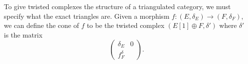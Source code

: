 
 
 To give twisted complexes the structure of a triangulated category, we must specify what the exact triangles are. Given a morphism $f: (E, \delta_E)\to (F, \delta_F)$, we can define the cone of $f$ to be the twisted complex $(E[1]\oplus F, \delta')$ where $\delta'$ is the matrix
 \[
    \left(\begin{array}{c|c} \delta_E &0 \\ \hline f^ \delta_F \end{array}\right).
\]

 